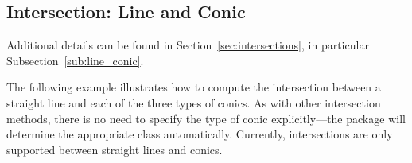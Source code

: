 

\subsection{Intersection: Line and Conic} %
\label{sub:intersection_line_conic}

Additional details can be found in Section~\ref{sec:intersections}, in particular Subsection~\ref{sub:line_conic}.

The following example illustrates how to compute the intersection between a straight line and each of the three types of conics.
As with other intersection methods, there is no need to specify the type of conic explicitly—the package will determine the appropriate class automatically.
Currently, intersections are only supported between straight lines and conics.

\vspace{1em}

